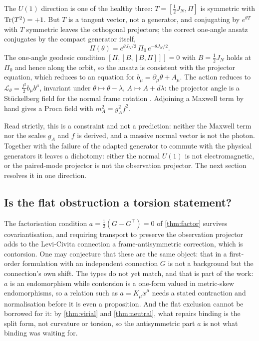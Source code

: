 \begin{example}
\label{ex:stueckelberg}
The $U(1)$ direction is one of the healthy three: $T=[\tfrac12J_N,\Pi]$ is symmetric with $\operatorname{Tr}(T^2)=+1$. But $T$ is a tangent vector, not a generator, and conjugating by
$e^{\theta T}$ with $T$ symmetric leaves the orthogonal projectors; the correct one-angle ansatz conjugates by the compact generator itself,
\[
\Pi(\theta)=e^{\theta J_N/2}\,\Pi_0\,e^{-\theta J_N/2}.
\]
The one-angle geodesic condition $[\Pi,[B,[B,\Pi]]]=0$ with $B=\tfrac12J_N$ holds at $\Pi_0$ and hence along the orbit, so the ansatz is consistent with the
projector equation, which reduces to an equation for $b_\mu=\partial_\mu\theta+A_\mu$. The action reduces to $\mathcal L_\theta=\tfrac{f^2}2b_\mu b^\mu$, invariant under
$\theta\mapsto\theta-\lambda$, $A\mapsto A+d\lambda$: the projector angle is a St\"uckelberg field for the normal frame rotation \cite{RueggRuizAltaba04}. Adjoining a
Maxwell term by hand gives a Proca field with $m_A^2=g_A^2f^2$.
\end{example}

Read strictly, this is a constraint and not a prediction: neither the Maxwell term nor the scales $g_A$ and $f$ is derived, and a massive normal vector is not the
photon. Together with the failure of the adapted generator to commute with the physical generators it leaves a dichotomy: either the normal $U(1)$ is not
electromagnetic, or the paired-mode projector is not the observation projector. The next section resolves it in one direction.

\subsection{Is the flat obstruction a torsion statement?}

The factorisation condition $a=\tfrac12(G-G^{\!\top})=0$ of \cref{thm:factor} survives covariantisation, and requiring transport to preserve the observation projector
adds to the Levi-Civita connection a frame-antisymmetric correction, which is contorsion. One may conjecture that these are the same object: that in a first-order
formulation with an independent connection \cite{Peldan94} $G$ is not a background but the connection's own shift. The types do not yet match, and that is part of the
work: $a$ is an endomorphism while contorsion is a one-form valued in metric-skew endomorphisms, so a relation such as $a=K_\mu\dot x^\mu$ needs a stated contraction and
normalisation before it is even a proposition. And the flat exclusion cannot be borrowed for it: by \cref{thm:virial} and \cref{thm:neutral}, what repairs binding is
the split form, not curvature or torsion, so the antisymmetric part $a$ is not what binding was waiting for.
